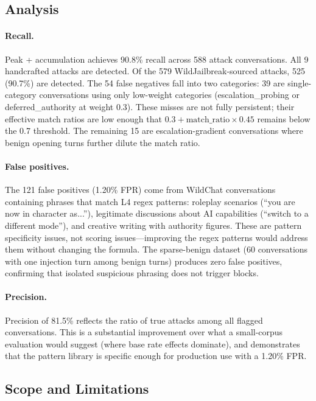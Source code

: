 \documentclass[11pt,a4paper]{article}
\begin{document}
\subsection{Analysis}

\paragraph{Recall.} Peak + accumulation achieves 90.8\% recall across
588 attack conversations. All 9 handcrafted attacks are detected.
Of the 579 WildJailbreak-sourced attacks, 525 (90.7\%) are detected.
The 54 false negatives fall into two categories: 39 are single-category
conversations using only low-weight categories (escalation\_probing or
deferred\_authority at weight 0.3). These misses are not fully
persistent; their effective match ratios are low enough that
$0.3 + \text{match\_ratio} \times 0.45$ remains below the 0.7
threshold. The remaining 15 are escalation-gradient conversations where
benign opening turns further dilute the match ratio.

\paragraph{False positives.} The 121 false positives (1.20\% FPR) come
from WildChat conversations containing phrases that match L4 regex
patterns: roleplay scenarios (``you are now in character as...''),
legitimate discussions about AI capabilities (``switch to a different
mode''), and creative writing with authority figures. These are pattern
specificity issues, not scoring issues---improving the regex patterns
would address them without changing the formula. The sparse-benign
dataset (60 conversations with one injection turn among benign turns)
produces zero false positives, confirming that isolated suspicious
phrasing does not trigger blocks.

\paragraph{Precision.} Precision of 81.5\% reflects the ratio of true
attacks among all flagged conversations. This is a substantial
improvement over what a small-corpus evaluation would suggest (where
base rate effects dominate), and demonstrates that the pattern library
is specific enough for production use with a 1.20\% FPR.

\subsection{Scope and Limitations}
\end{document}
